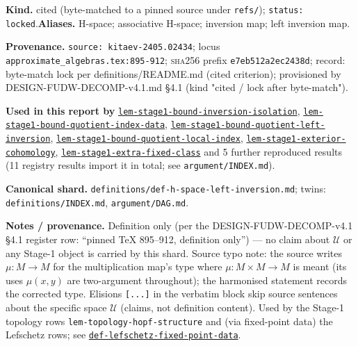 \begin{defnote}
\textbf{Kind.} cited (byte-matched to a pinned source under \texttt{refs/}); \texttt{status: locked}.\quad\textbf{Aliases.} H-space; associative H-space; inversion map; left inversion map.
\par
\textbf{Provenance.} \texttt{source: kitaev-\allowbreak{}2405.\allowbreak{}02434}; locus \texttt{approximate\_algebras.\allowbreak{}tex:\allowbreak{}895-\allowbreak{}912}; \textsc{sha256} prefix \texttt{e7eb512a2ec2438d}; record: byte-\allowbreak{}match lock per definitions/\allowbreak{}README.\allowbreak{}md (cited criterion);\allowbreak{} provisioned by DESIGN-\allowbreak{}FUDW-\allowbreak{}DECOMP-\allowbreak{}v4.\allowbreak{}1.\allowbreak{}md \S{}4.\allowbreak{}1 (kind "cited /\allowbreak{} lock after byte-\allowbreak{}match").
\par
\textbf{Used in this report by} \hyperref[lem:stage1-bound-inversion-isolation]{\texttt{lem-\allowbreak{}stage1-\allowbreak{}bound-\allowbreak{}inversion-\allowbreak{}isolation}}, \hyperref[lem:stage1-bound-quotient-index-data]{\texttt{lem-\allowbreak{}stage1-\allowbreak{}bound-\allowbreak{}quotient-\allowbreak{}index-\allowbreak{}data}}, \hyperref[lem:stage1-bound-quotient-left-inversion]{\texttt{lem-\allowbreak{}stage1-\allowbreak{}bound-\allowbreak{}quotient-\allowbreak{}left-\allowbreak{}inversion}}, \hyperref[lem:stage1-bound-quotient-local-index]{\texttt{lem-\allowbreak{}stage1-\allowbreak{}bound-\allowbreak{}quotient-\allowbreak{}local-\allowbreak{}index}}, \hyperref[lem:stage1-exterior-cohomology]{\texttt{lem-\allowbreak{}stage1-\allowbreak{}exterior-\allowbreak{}cohomology}}, \hyperref[lem:stage1-extra-fixed-class]{\texttt{lem-\allowbreak{}stage1-\allowbreak{}extra-\allowbreak{}fixed-\allowbreak{}class}} and 5 further reproduced results (11 registry results import it in total; see \texttt{argument/INDEX.md}).
\par
\textbf{Canonical shard.} \texttt{definitions/\allowbreak{}def-\allowbreak{}h-\allowbreak{}space-\allowbreak{}left-\allowbreak{}inversion.\allowbreak{}md}; twins: \texttt{definitions/INDEX.md}, \texttt{argument/DAG.md}.
\par
\textbf{Notes / provenance.} Definition only (per the DESIGN-FUDW-DECOMP-v4.1 \S{}4.1
register row: ``pinned TeX 895--912, definition only'') --- no claim about $\mathcal U$
or any Stage-1 object is carried by this shard. Source typo note: the source
writes $\mu\colon M\to M$ for the multiplication map's type where
$\mu\colon M\times M\to M$ is meant (its uses $\mu(x,y)$ are two-argument
throughout); the harmonised statement records the corrected type. Elisions
\texttt{[...\allowbreak{}]} in the verbatim block skip source sentences about the specific space
$\mathcal U$ (claims, not definition content). Used by the Stage-1 topology rows
\texttt{lem-\allowbreak{}topology-\allowbreak{}hopf-\allowbreak{}structure} and (via fixed-point data) the Lefschetz rows; see
\hyperref[def:lefschetz-fixed-point-data]{\texttt{def-\allowbreak{}lefschetz-\allowbreak{}fixed-\allowbreak{}point-\allowbreak{}data}}.
\end{defnote}

